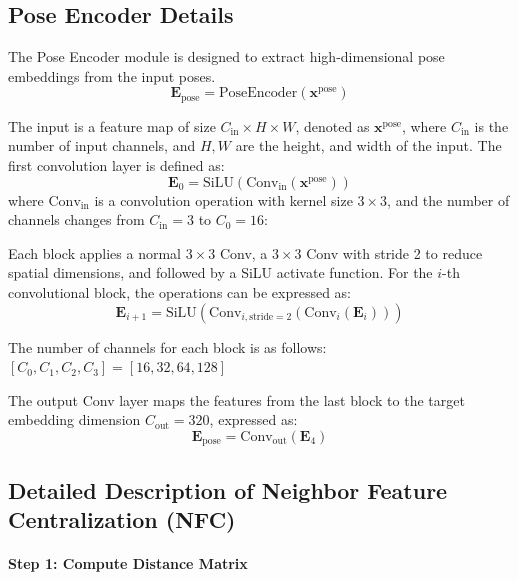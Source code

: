 \subsection{Pose Encoder Details}

The Pose Encoder module is designed to extract high-dimensional pose embeddings from the input poses. 
\begin{equation}
\mathbf{E}_{\text{pose}} = \text{PoseEncoder}(\mathbf{x}^{\text{pose}})
\end{equation}

The input is a feature map of size \(C_{\text{in}} \times H \times W\), denoted as \( \mathbf{x}^{\text{pose}} \), 
where \(C_{\text{in}}\) is the number of input channels, and \(H, W\) are the height, and width of the input. 
The first convolution layer is defined as:
\begin{equation}
\mathbf{E}_0 = \text{SiLU}(\text{Conv}_{\text{in}}(\mathbf{x}^{\text{pose}}))
\end{equation}
where \( \text{Conv}_{\text{in}} \) is a convolution operation with kernel size \(3 \times 3\), 
and the number of channels changes from \( C_{\text{in}} =3\) to \( C_0 =16\):

Each block applies a normal \(3 \times 3\) Conv, a \(3 \times 3\) Conv with stride 2 to reduce spatial dimensions, and followed by a SiLU activate function.
For the \(i\)-th convolutional block, the operations can be expressed as:
\begin{equation}
\mathbf{E}_{i+1} = \text{SiLU}(\text{Conv}_{i, \text{stride}=2}(\text{Conv}_{i}(\mathbf{E}_i)))
\end{equation}

The number of channels for each block is as follows: $[C_0, C_1, C_2, C_3] = [16, 32, 64, 128]$

The output Conv layer maps the features from the last block to the target embedding dimension \(C_{\text{out}} = 320\), 
expressed as:
\begin{equation}
\mathbf{E}_{\text{pose}} = \text{Conv}_{\text{out}}(\mathbf{E}_4)
\end{equation}


\subsection{Detailed Description of Neighbor Feature Centralization (NFC)}

\paragraph{Step 1: Compute Distance Matrix}

